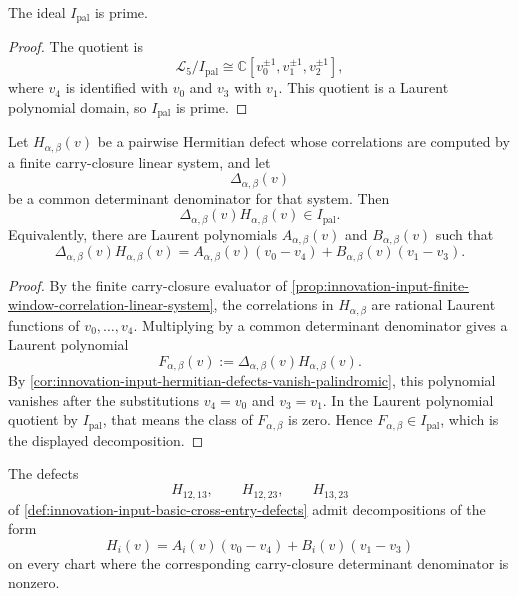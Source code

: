 \begin{proposition}
\label{prop:innovation-input-palindromic-ideal-prime}
The ideal $I_{\mathrm{pal}}$ is prime.
\end{proposition}

\begin{proof}
The quotient is
$$
\mathcal L_5/I_{\mathrm{pal}}
\cong
\mathbb C[v_0^{\pm1},v_1^{\pm1},v_2^{\pm1}],
$$
where $v_4$ is identified with $v_0$ and $v_3$ with $v_1$. This quotient
is a Laurent polynomial domain, so $I_{\mathrm{pal}}$ is prime.
\end{proof}

\begin{theorem}
\label{thm:innovation-input-cleared-hermitian-defects-palindromic-ideal}
Let $H_{\alpha,\beta}(v)$ be a pairwise Hermitian defect whose
correlations are computed by a finite carry-closure linear system, and let
$$
\Delta_{\alpha,\beta}(v)
$$
be a common determinant denominator for that system. Then
$$
\Delta_{\alpha,\beta}(v)H_{\alpha,\beta}(v)\in I_{\mathrm{pal}}.
$$
Equivalently, there are Laurent polynomials
$A_{\alpha,\beta}(v)$ and $B_{\alpha,\beta}(v)$ such that
$$
\Delta_{\alpha,\beta}(v)H_{\alpha,\beta}(v)
=
A_{\alpha,\beta}(v)(v_0-v_4)
+
B_{\alpha,\beta}(v)(v_1-v_3).
$$
\end{theorem}

\begin{proof}
By the finite carry-closure evaluator of
\autoref{prop:innovation-input-finite-window-correlation-linear-system},
the correlations in $H_{\alpha,\beta}$ are rational Laurent functions of
$v_0,\ldots,v_4$. Multiplying by a common determinant denominator gives a
Laurent polynomial
$$
F_{\alpha,\beta}(v)
:=
\Delta_{\alpha,\beta}(v)H_{\alpha,\beta}(v).
$$
By
\autoref{cor:innovation-input-hermitian-defects-vanish-palindromic},
this polynomial vanishes after the substitutions $v_4=v_0$ and
$v_3=v_1$. In the Laurent polynomial quotient by $I_{\mathrm{pal}}$, that
means the class of $F_{\alpha,\beta}$ is zero. Hence
$F_{\alpha,\beta}\in I_{\mathrm{pal}}$, which is the displayed
decomposition.
\end{proof}

\begin{corollary}
\label{cor:innovation-input-basic-defects-nonpalindromic-factors}
The defects
$$
H_{12,13},
\qquad
H_{12,23},
\qquad
H_{13,23}
$$
of
\autoref{def:innovation-input-basic-cross-entry-defects} admit
decompositions of the form
$$
H_i(v)
=
A_i(v)(v_0-v_4)+B_i(v)(v_1-v_3)
$$
on every chart where the corresponding carry-closure determinant
denominator is nonzero.
\end{corollary}

